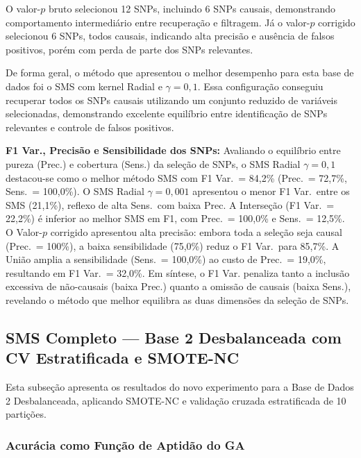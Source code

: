 \documentclass[12pt,a4paper]{article}
\newcommand{\novo}[1]{\textcolor{corNova}{#1}}
\begin{document}
O valor-$p$ bruto selecionou 12 SNPs, incluindo 6 SNPs causais, demonstrando comportamento intermediário entre recuperação e filtragem. Já o valor-$p$ corrigido selecionou 6 SNPs, todos causais, indicando alta precisão e ausência de falsos positivos, porém com perda de parte dos SNPs relevantes.

De forma geral, o método que apresentou o melhor desempenho para esta base de dados foi o SMS com kernel Radial e $\gamma = 0{,}1$. Essa configuração conseguiu recuperar todos os SNPs causais utilizando um conjunto reduzido de variáveis selecionadas, demonstrando excelente equilíbrio entre identificação de SNPs relevantes e controle de falsos positivos.


\novo{\textbf{F1 Var., Precisão e Sensibilidade dos SNPs:} Avaliando o equilíbrio entre pureza (Prec.) e cobertura (Sens.) da seleção de SNPs, o SMS Radial $\gamma=0{,}1$ destacou-se como o melhor método SMS com F1 Var.\ = 84,2\% (Prec.\ = 72,7\%, Sens.\ = 100,0\%). O SMS Radial $\gamma=0{,}001$ apresentou o menor F1 Var.\ entre os SMS (21,1\%), reflexo de alta Sens.\ com baixa Prec. A Interseção (F1 Var.\ = 22,2\%) é inferior ao melhor SMS em F1, com Prec.\ = 100,0\% e Sens.\ = 12,5\%. O Valor-$p$ corrigido apresentou alta precisão: embora toda a seleção seja causal (Prec.\ = 100\%), a baixa sensibilidade (75,0\%) reduz o F1 Var.\ para 85,7\%. A União amplia a sensibilidade (Sens.\ = 100,0\%) ao custo de Prec.\ = 19,0\%, resultando em F1 Var.\ = 32,0\%. Em síntese, o F1 Var. penaliza tanto a inclusão excessiva de não-causais (baixa Prec.) quanto a omissão de causais (baixa Sens.), revelando o método que melhor equilibra as duas dimensões da seleção de SNPs.}
\subsection{\novo{SMS Completo --- Base 2 Desbalanceada com CV Estratificada e SMOTE-NC}}

\novo{Esta subseção apresenta os resultados do novo experimento para a Base de Dados 2 Desbalanceada, aplicando SMOTE-NC e validação cruzada estratificada de 10 partições.}

\subsubsection{\novo{Acurácia como Função de Aptidão do GA}}
\end{document}
